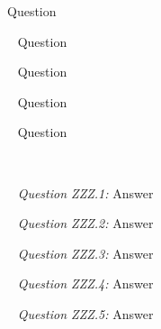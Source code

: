 \documentclass[12pt]{article}
\begin{document}
\date{}
\maketitle


\newline
Question

~\newline
{}
\newline
Question

~\newline
{}
\newline
Question

~\newline
{}
\newline
Question

~\newline
{}
\newline
Question

~\newline

\pagebreak
{}

~\newline
\textit{Question ZZZ.1:}
\newline
Answer

~\newline
\textit{Question ZZZ.2:}
\newline
Answer

~\newline
\textit{Question ZZZ.3:}
\newline
Answer

~\newline
\textit{Question ZZZ.4:}
\newline
Answer

~\newline
\textit{Question ZZZ.5:}
\newline
Answer

~\newline
\end{document}
